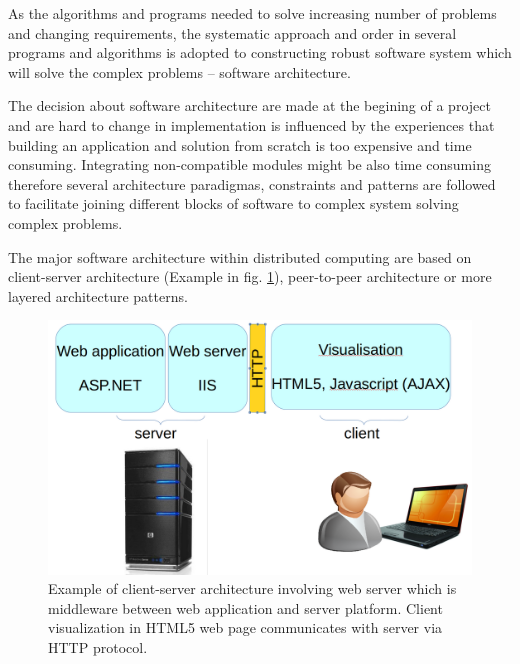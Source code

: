 As the algorithms and programs needed to solve increasing number of problems and changing requirements, the systematic approach and order in several programs and algorithms is adopted to constructing robust software system which will solve the complex problems -- software architecture.

The decision about software architecture are made at the begining of a project and are hard to change in implementation is influenced by the experiences that building an application and solution from scratch is too expensive and time consuming. Integrating non-compatible modules might be also time consuming therefore several architecture paradigmas, constraints and patterns are followed to facilitate joining different blocks of software to complex system solving complex problems.

The major software architecture within distributed computing are based on client-server architecture (Example in fig. \ref{fig:architecture}), peer-to-peer architecture or more layered architecture patterns.
\begin{figure}[ht]
    \centering
    \includegraphics[width=1\textwidth]{chapter2/architektura.png}
    \caption{Example of client-server architecture involving web server which is middleware between web application and server platform. Client visualization in HTML5 web page communicates with server via HTTP protocol.}
    \label{fig:architecture}
\end{figure}


